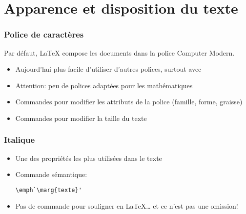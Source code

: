 
\section{Apparence et disposition du texte}

\begin{frame}
  \frametitle{Police de caractères}

  Par défaut, {\LaTeX} compose les documents dans la police
  {\CM Computer Modern}.

  \begin{itemize}
  \item Aujourd'hui plus facile d'utiliser d'autres polices, surtout
    avec {\XeLaTeX}
  \item \alert{Attention}: peu de polices adaptées pour les
    mathématiques
  \item Commandes pour modifier les \alert{attributs} de la police
    (famille, forme, graisse)
  \item Commandes pour modifier la \alert{taille} du texte
  \end{itemize}
\end{frame}

\begin{frame}[fragile=singleslide]
  \frametitle{Italique}
  \begin{itemize}
  \item Une des propriétés les plus utilisées dans le texte
  \item Commande sémantique:
\begin{lstlisting}
\emph`\marg{texte}'
\end{lstlisting}
  \item Pas de commande pour souligner en {\LaTeX\dots} et ce n'est
    pas une omission!
  \end{itemize}
\end{frame}

